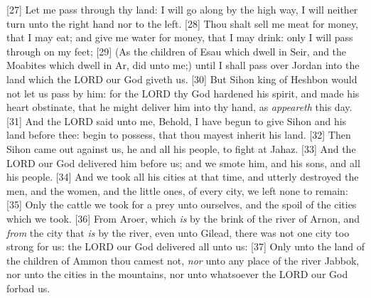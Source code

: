 [27] \textcolor[rgb]{0.00,0.00,1.00}{Let me pass through thy land: I will go along by the high way, I will neither turn unto the right hand nor to the left.}
[28] \textcolor[rgb]{0.00,0.00,1.00}{Thou shalt sell me meat for money, that I may eat; and give me water for money, that I may drink: only I will pass through on my feet;}
[29] \textcolor[rgb]{0.00,0.00,1.00}{(As the children of Esau which dwell in Seir, and the Moabites which dwell in Ar, did unto me;) until I shall pass over Jordan into the land which the LORD our God giveth us.}
[30] \textcolor[rgb]{0.00,0.00,1.00}{But Sihon king of Heshbon would not let us pass by him: for the LORD thy God hardened his spirit, and made his heart obstinate, that he might deliver him into thy hand, as \emph{appeareth} this day.}
[31] \textcolor[rgb]{0.00,0.00,1.00}{And the LORD said unto me, Behold, I have begun to give Sihon and his land before thee: begin to possess, that thou mayest inherit his land.}
[32] \textcolor[rgb]{0.00,0.00,1.00}{Then Sihon came out against us, he and all his people, to fight at Jahaz.}
[33] \textcolor[rgb]{0.00,0.00,1.00}{And the LORD our God delivered him before us; and we smote him, and his sons, and all his people.}
[34] \textcolor[rgb]{0.00,0.00,1.00}{And we took all his cities at that time, and utterly destroyed the men, and the women, and the little ones, of every city, we left none to remain:}
[35] \textcolor[rgb]{0.00,0.00,1.00}{Only the cattle we took for a prey unto ourselves, and the spoil of the cities which we took.}
[36] \textcolor[rgb]{0.00,0.00,1.00}{From Aroer, which \emph{is} by the brink of the river of Arnon, and \emph{from} the city that \emph{is} by the river, even unto Gilead, there was not one city too strong for us: the LORD our God delivered all unto us:}
[37] \textcolor[rgb]{0.00,0.00,1.00}{Only unto the land of the children of Ammon thou camest not, \emph{nor} unto any place of the river Jabbok, nor unto the cities in the mountains, nor unto whatsoever the LORD our God forbad us.}
\newpage
